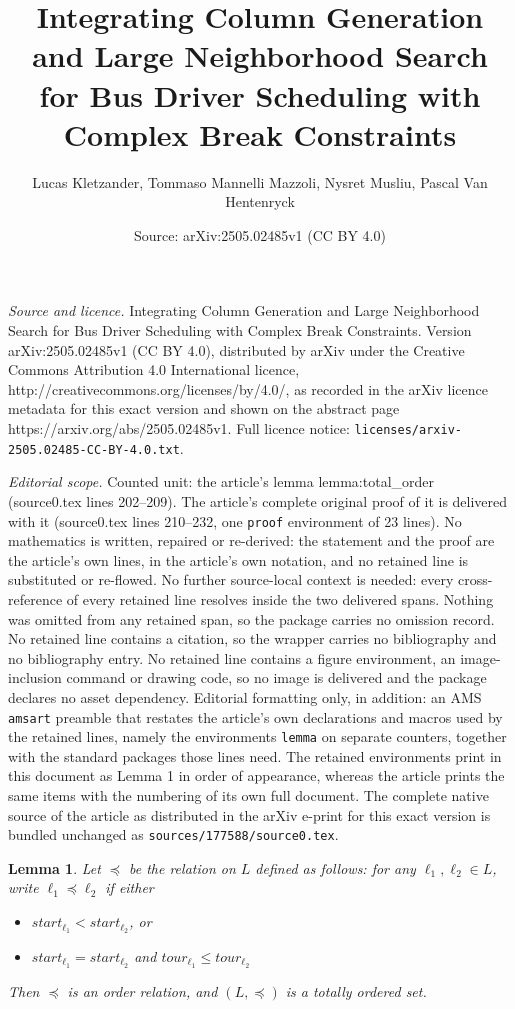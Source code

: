 \documentclass[10pt,a4paper]{amsart}
\title{Integrating Column Generation and Large Neighborhood Search for Bus Driver Scheduling with Complex Break Constraints}
\author{Lucas Kletzander, Tommaso Mannelli Mazzoli, Nysret Musliu, Pascal Van Hentenryck}
\date{Source: arXiv:2505.02485v1 (CC BY 4.0)}
\newtheorem{lemma}{Lemma}
\newcommand{\param}{\mathit}
\begin{document}
\maketitle

\noindent\emph{Source and licence.} Integrating Column Generation and Large Neighborhood Search for Bus Driver Scheduling with Complex Break Constraints. Version arXiv:2505.02485v1 (CC BY 4.0), distributed by arXiv under the Creative Commons Attribution 4.0 International licence, http://creativecommons.org/licenses/by/4.0/, as recorded in the arXiv licence metadata for this exact version and shown on the abstract page https://arxiv.org/abs/2505.02485v1. Full licence notice: \texttt{licenses/arxiv-2505.02485-CC-BY-4.0.txt}.\par\smallskip

\noindent\textit{Editorial scope.} Counted unit: the article's lemma lemma:total\_order (source0.tex lines 202--209). The article's complete original proof of it is delivered with it (source0.tex lines 210--232, one \texttt{proof} environment of 23 lines). No mathematics is written, repaired or re-derived: the statement and the proof are the article's own lines, in the article's own notation, and no retained line is substituted or re-flowed.  No further source-local context is needed: every cross-reference of every retained line resolves inside the two delivered spans.  Nothing was omitted from any retained span, so the package carries no omission record.  No retained line contains a citation, so the wrapper carries no bibliography and no bibliography entry.  No retained line contains a figure environment, an image-inclusion command or drawing code, so no image is delivered and the package declares no asset dependency.  Editorial formatting only, in addition: an AMS \texttt{amsart} preamble that restates the article's own declarations and macros used by the retained lines, namely the environments \texttt{lemma} on separate counters, together with the standard packages those lines need.  The retained environments print in this document as Lemma 1 in order of appearance, whereas the article prints the same items with the numbering of its own full document.  The complete native source of the article as distributed in the arXiv e-print for this exact version is bundled unchanged as \texttt{sources/177588/source0.tex}.
\begin{lemma}\label{lemma:total_order}
Let $\preceq$ be the relation on $L$ defined as follows: for any $\ell_1,\ell_2 \in L$, write $\ell_1\preceq \ell_2$ if either 
\begin{itemize}
    \item $\param{start}_{\ell_1} <\param{start}_{\ell_2} $, or 
    \item $\param{start}_{\ell_1} = \param{start}_{\ell_2}$ and $ \param{tour}_{\ell_1}  \le \param{tour}_{\ell_2}$
\end{itemize}
Then  $\preceq$ is an order relation, and  $(L, \preceq)$ is a totally ordered set.
\end{lemma}
\end{document}
